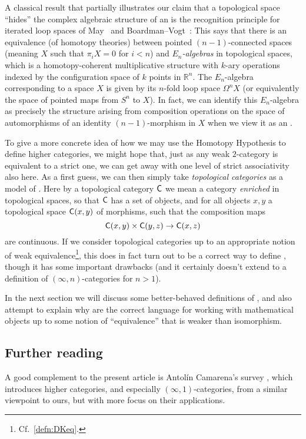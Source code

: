 \documentclass[a4paper,11pt]{article}
\begin{document}
\begin{remark}
  A classical result that partially illustrates our claim that a
  topological space ``hides'' the complex algebraic structure of an
  \igpd{} is the recognition principle for iterated loop spaces of
  May~\cite{May} and Boardman--Vogt~\cite{BoardmanVogt}: This says
  that there is an equivalence (of homotopy theories) between pointed
  $(n-1)$-connected spaces (meaning $X$ such that $\pi_{i}X = 0$ for
  $i < n$) and \emph{$E_{n}$-algebras} in topological spaces, which is
  a homotopy-coherent multiplicative structure with $k$-ary operations
  indexed by the configuration space of $k$ points in
  $\mathbb{R}^{n}$. The $E_{n}$-algebra corresponding to a space $X$
  is given by its $n$-fold loop space $\Omega^{n}X$ (or equivalently
  the space of pointed maps from $S^{n}$ to $X$). In fact, we can
  identify this $E_{n}$-algebra as precisely the structure arising
  from composition operations on the space of automorphisms of an
  identity $(n-1)$-morphism in $X$ when we view it as an \igpd{}.
\end{remark}

To give a more concrete idea of how we may use the Homotopy Hypothesis
to define higher categories, we might hope that, just as any weak
$2$-category is equivalent to a strict one, we can get away with one
level of strict associativity also here. As a first guess, we can then
simply take \emph{topological categories} as a model of \icats{}. Here
by a topological category $\textup{\textsf{C}}$ we mean a category \emph{enriched} in
topological spaces, so that $\textup{\textsf{C}}$ has a set of objects, and for all
objects $x,y$ a topological space $\textup{\textsf{C}}(x,y)$ of morphisms, such that
the composition maps
\[ \uC(x,y) \times \uC(y,z) \to \uC(x,z)\] are continuous. If we
consider topological categories up to an appropriate notion of weak
equivalence\footnote{Cf.~\cref{defn:DKeq}.}, this does in fact turn
out to be a correct way to define \icats{}, though it has some
important drawbacks (and it certainly doesn't extend to a definition
of $(\infty,n)$-categories for $n > 1$).

In the next section we will discuss some better-behaved definitions of
\icats{}, and also attempt to explain why \icats{} are the correct
language for working with mathematical objects up to some notion of
``equivalence'' that is weaker than isomorphism.

\subsection{Further reading}
A good complement to the present article is Antol\'in Camarena's
survey \cite{Omar}, which introduces higher categories, and
especially $(\infty,1)$-categories, from a similar viewpoint to ours,
but with more focus on their applications.
\end{document}
